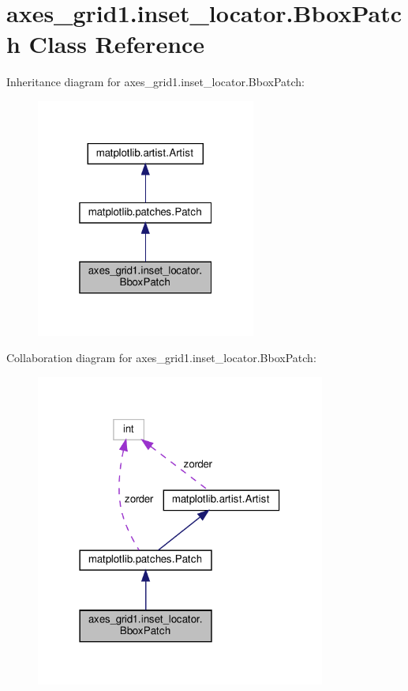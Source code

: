 \hypertarget{classaxes__grid1_1_1inset__locator_1_1BboxPatch}{}\section{axes\+\_\+grid1.\+inset\+\_\+locator.\+Bbox\+Patch Class Reference}
\label{classaxes__grid1_1_1inset__locator_1_1BboxPatch}


Inheritance diagram for axes\+\_\+grid1.\+inset\+\_\+locator.\+Bbox\+Patch\+:
\nopagebreak
\begin{figure}[H]
\begin{center}
\leavevmode
\includegraphics[width=205pt]{classaxes__grid1_1_1inset__locator_1_1BboxPatch__inherit__graph}
\end{center}
\end{figure}


Collaboration diagram for axes\+\_\+grid1.\+inset\+\_\+locator.\+Bbox\+Patch\+:
\nopagebreak
\begin{figure}[H]
\begin{center}
\leavevmode
\includegraphics[width=270pt]{classaxes__grid1_1_1inset__locator_1_1BboxPatch__coll__graph}
\end{center}
\end{figure}
